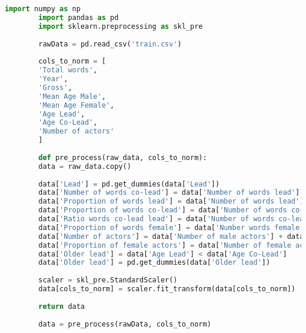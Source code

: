 \documentclass[../../project.tex]{subfiles}
\begin{document}
	\begin{lstlisting}[language=Python]
		import numpy as np
		import pandas as pd
		import sklearn.preprocessing as skl_pre
		
		rawData = pd.read_csv('train.csv')
		
		cols_to_norm = [
		'Total words',
		'Year',
		'Gross',
		'Mean Age Male',
		'Mean Age Female',
		'Age Lead',
		'Age Co-Lead',
		'Number of actors'
		]
		
		def pre_process(raw_data, cols_to_norm):
		data = raw_data.copy()
		
		data['Lead'] = pd.get_dummies(data['Lead'])
		data['Number of words co-lead'] = data['Number of words lead'] - data['Difference in words lead and co-lead']
		data['Proportion of words lead'] = data['Number of words lead']/data['Total words']
		data['Proportion of words co-lead'] = data['Number of words co-lead']/data['Total words']
		data['Ratio words co-lead lead'] = data['Number of words co-lead']/data['Number of words lead']
		data['Proportion of words female'] = data['Number words female']/(data['Total words'] - data['Number of words lead'])
		data['Number of actors'] = data['Number of male actors'] + data['Number of female actors']
		data['Proportion of female actors'] = data['Number of female actors']/data['Number of actors']
		data['Older lead'] = data['Age Lead'] < data['Age Co-Lead']
		data['Older lead'] = pd.get_dummies(data['Older lead'])
		
		scaler = skl_pre.StandardScaler()
		data[cols_to_norm] = scaler.fit_transform(data[cols_to_norm])
		
		return data
		
		data = pre_process(rawData, cols_to_norm)
	\end{lstlisting}
\end{document}
